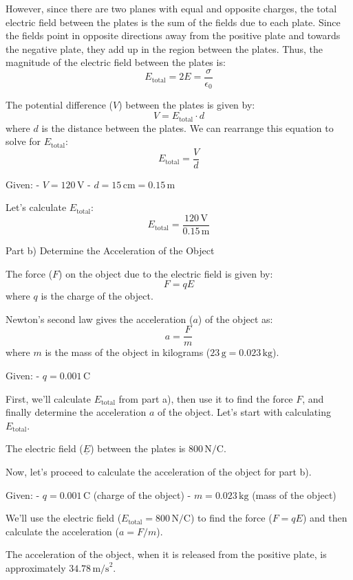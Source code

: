 \documentclass[a4paper,11pt]{article}
\begin{document}
However, since there are two planes with equal and opposite charges, the total electric field between the plates is the sum of the fields due to each plate. Since the fields point in opposite directions away from the positive plate and towards the negative plate, they add up in the region between the plates. Thus, the magnitude of the electric field between the plates is:
\[ E_{\text{total}} = 2E = \frac{\sigma}{\epsilon_0} \]

The potential difference (\( V \)) between the plates is given by:
\[ V = E_{\text{total}} \cdot d \]
where \( d \) is the distance between the plates. We can rearrange this equation to solve for \( E_{\text{total}} \):
\[ E_{\text{total}} = \frac{V}{d} \]

Given:
- \( V = 120 \, \text{V} \)
- \( d = 15 \, \text{cm} = 0.15 \, \text{m} \)

Let's calculate \( E_{\text{total}} \):
\[ E_{\text{total}} = \frac{120 \, \text{V}}{0.15 \, \text{m}} \]

Part b) Determine the Acceleration of the Object

The force (\( F \)) on the object due to the electric field is given by:
\[ F = qE \]
where \( q \) is the charge of the object.

Newton's second law gives the acceleration (\( a \)) of the object as:
\[ a = \frac{F}{m} \]
where \( m \) is the mass of the object in kilograms (\( 23 \, \text{g} = 0.023 \, \text{kg} \)).

Given:
- \( q = 0.001 \, \text{C} \)

First, we'll calculate \( E_{\text{total}} \) from part a), then use it to find the force \( F \), and finally determine the acceleration \( a \) of the object. Let's start with calculating \( E_{\text{total}} \).

The electric field (\( \underline{E} \)) between the plates is \( 800 \, \text{N/C} \).

Now, let's proceed to calculate the acceleration of the object for part b).

Given:
- \( q = 0.001 \, \text{C} \) (charge of the object)
- \( m = 0.023 \, \text{kg} \) (mass of the object)

We'll use the electric field (\( E_{\text{total}} = 800 \, \text{N/C} \)) to find the force (\( F = qE \)) and then calculate the acceleration (\( a = F/m \)).

The acceleration of the object, when it is released from the positive plate, is approximately \( 34.78 \, \text{m/s}^2 \).
\end{document}
